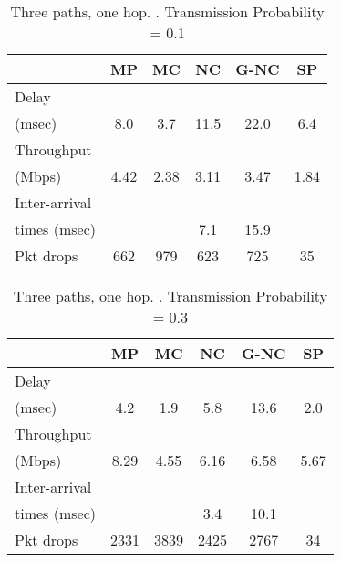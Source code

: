 \documentclass[journal, onecolumn, 12pt]{IEEEtran}
\begin{document}
\begin{table}[hb]
\begin{center}
\scriptsize
\begin{tabular}{|l|c|c|c|c|c|}
\hline
~                                    & MP & MC & NC & G-NC & SP \\ \hline
Delay           &   &   &  &  & \\
(msec)   & 8.0 & 3.7  & 11.5  & 22.0 & 6.4  \\ \hline
Throughput                   & ~  & ~  & ~  & ~         & ~  \\
(Mbps)                   & 4.42  & 2.38  & 3.11 & 3.47 & 1.84\\ \hline
Inter-arrival              & ~  & ~  & ~  & ~         & ~  \\
times (msec)   &   &   &  7.1 & 15.9 & \\ \hline
Pkt drops  & 662  & 979  & 623  & 725 & 35 \\ \hline
\end{tabular}
\end{center}
\caption {Three paths, one hop. . Transmission Probability = 0.1}
\label{tab:sim_topol_4_0.1}
\end{table}

\begin{table}[hb]
\begin{center}
\scriptsize
\begin{tabular}{|l|c|c|c|c|c|}
\hline
~                                    & MP & MC & NC & G-NC & SP \\ \hline
Delay           &   &   &  &  & \\
(msec)   & 4.2  & 1.9 & 5.8  & 13.6 & 2.0  \\ \hline
Throughput                   & ~  & ~  & ~  & ~         & ~  \\
(Mbps)                   & 8.29  & 4.55  & 6.16 & 6.58 & 5.67\\ \hline
Inter-arrival              & ~  & ~  & ~  & ~         & ~  \\
times (msec)   &   &   &  3.4 & 10.1 & \\ \hline
Pkt drops  & 2331  & 3839  & 2425  & 2767 & 34 \\ \hline
\end{tabular}
\end{center}
\caption {Three paths, one hop. . Transmission Probability = 0.3}
\label{tab:sim_topol_4_0.3}
\end{table}
\end{document}
